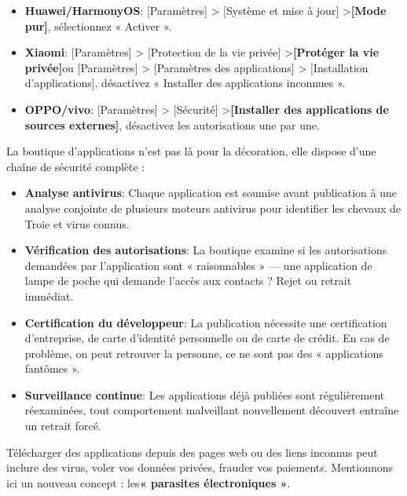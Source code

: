 
\begin{itemize}
  \item \textbf{Huawei/HarmonyOS}: [Paramètres] > [Système et mise à jour] >\textbf{[Mode pur]}, sélectionnez « Activer ».
  \item \textbf{Xiaomi}: [Paramètres] > [Protection de la vie privée] >\textbf{[Protéger la vie privée]}ou [Paramètres] > [Paramètres des applications] > [Installation d'applications], désactivez « Installer des applications inconnues ».
  \item \textbf{OPPO/vivo}: [Paramètres] > [Sécurité] >\textbf{[Installer des applications de sources externes]}, désactivez les autorisations une par une.
\end{itemize}


La boutique d'applications n'est pas là pour la décoration, elle dispose d'une chaîne de sécurité complète :

\begin{itemize}
  \item \textbf{Analyse antivirus}: Chaque application est soumise avant publication à une analyse conjointe de plusieurs moteurs antivirus pour identifier les chevaux de Troie et virus connus.
  \item \textbf{Vérification des autorisations}: La boutique examine si les autorisations demandées par l'application sont « raisonnables » — une application de lampe de poche qui demande l'accès aux contacts ? Rejet ou retrait immédiat.
  \item \textbf{Certification du développeur}: La publication nécessite une certification d'entreprise, de carte d'identité personnelle ou de carte de crédit. En cas de problème, on peut retrouver la personne, ce ne sont pas des « applications fantômes ».
  \item \textbf{Surveillance continue}: Les applications déjà publiées sont régulièrement réexaminées, tout comportement malveillant nouvellement découvert entraîne un retrait forcé.
\end{itemize}


Télécharger des applications depuis des pages web ou des liens inconnus peut inclure des virus, voler vos données privées, frauder vos paiements. Mentionnons ici un nouveau concept : les\textbf{« parasites électroniques »}.


